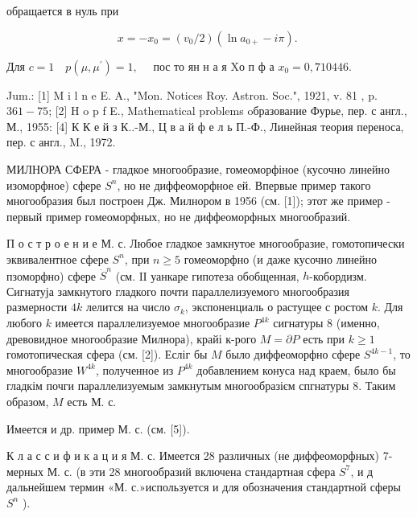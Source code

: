 \documentclass[10pt]{article}
\begin{document}
обращается в нуль при



\[

x=-x_{0}=\left(v_{0} / 2\right)\left(\ln a_{0+}-i \pi\right) \text {. }

\]



Для $c=1 \quad p\left(\mu, \mu^{\prime}\right)=1, \quad$ пос то ян н а я $\mathrm{X} о$ п ф а $x_{0}=0,710446$.



Jum.: [1] M i l n e E. A., "Mon. Notices Roy. Astron. Soc.", 1921, v. 81 , p. $361-75$; [2] H o p f E., Mathematical problems oбразование Фурье, пер. с англ., М., 1955: [4] К К е й з К..-М., Ц в а й ф е л ь П.-Ф., Линейная теория переноса, пер. с англ., M., 1972.



МИЛНОРА СФЕРА - гладкое многообразие, гомеоморфіное (кусочно линейно изоморфное) сфере $S^{n}$, но не диффеоморфное ей. Впервые пример такого многообразия был построен Дж. Милнором в 1956 (см. [1]); этот же пример - первый пример гомеоморфных, но не диффеоморфных многообразий.



П о с т р о е н и е М. с. Любое гладкое замкнутое многообразие, гомотопически эквивалентное сфере $S^{n}$, при $n \geqslant 5$ гомеоморфно (и даже кусочно линейно пзоморфно) сфере $\dot{S}^{n}$ (см. IІ уанкаре гипотеза обобщенная, $h$-кобордизм. Сигнатуја замкнутого гладкого почти параллелизуемого многообразия размерности $4 k$ лелится на число $\sigma_{k}$, экспоненциаль о растущее с ростом $k$. Для любого $k$ имеется параллелизуемое многообразие $P^{4 k}$ сигнатуры 8 (именно, древовидное многообразие Милнора), крайі к-рого $M=\partial P$ есть при $k \geqslant 1$ гомотопическая сфера (см. [2]). Есліг бы $M$ было диффеоморфно сфере $S^{4 k-1}$, то многообразие $W^{4 k}$, полученное из $P^{4 k}$ добавлением конуса над краем, было бы гладкім почги параллелизуемым замкнутым многообразієм спгнатуры 8. Таким образом, $M$ есть М. с.



Имеется и др. пример М. с. (см. [5]).



К л а с с и ф и к а ц и я М. с. Имеется 28 различных (не диффеоморфных) 7-мерных М. с. (в эти 28 многообразий включена стандартная сфера $S^{7}$, и д дальнейшем термин «М. с.»используется и для обозначения стандартной сферы $S^{n}$ ).
\end{document}
